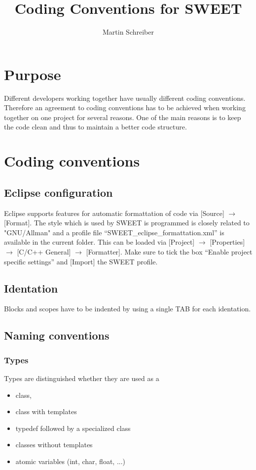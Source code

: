 \documentclass[10pt,a4paper]{article}
\author{Martin Schreiber}
\title{Coding Conventions for SWEET}
\begin{document}
\maketitle

\section{Purpose}
Different developers working together have usually different coding conventions.
Therefore an agreement to coding conventions has to be achieved when working together on one project for several reasons.
One of the main reasons is to keep the code clean and thus to maintain a better code structure.


\section{Coding conventions}

\subsection{Eclipse configuration}
Eclipse supports features for automatic formattation of code via [Source] $\rightarrow$ [Format].
The style which is used by SWEET is programmed is closely related to "GNU/Allman" and a profile file ``SWEET\_eclipse\_formattation.xml'' is available in the current folder.
This can be loaded via [Project] $\rightarrow$ [Properties] $\rightarrow$ [C/C++ General] $\rightarrow$ [Formatter].
Make sure to tick the box ``Enable project specific settings'' and [Import] the SWEET profile.

\subsection{Identation}
Blocks and scopes have to be indented by using a single TAB for each identation.

\subsection{Naming conventions}

\subsubsection{Types}

Types are distinguished whether they are used as a
\begin{itemize}
	\item class,
	\item class with templates
	\item typedef followed by a specialized class
	\item classes without templates
	\item atomic variables (int, char, float, ...)
\end{itemize}
\end{document}
